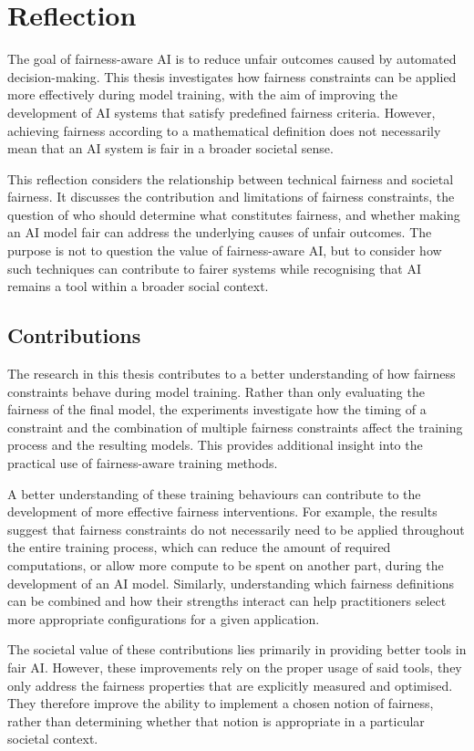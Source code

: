 \chapter{Reflection}
The goal of fairness-aware AI is to reduce unfair outcomes caused by automated decision-making. This thesis investigates how fairness constraints can be applied more effectively during model training, with the aim of improving the development of AI systems that satisfy predefined fairness criteria. However, achieving fairness according to a mathematical definition does not necessarily mean that an AI system is fair in a broader societal sense.

This reflection considers the relationship between technical fairness and societal fairness. It discusses the contribution and limitations of fairness constraints, the question of who should determine what constitutes fairness, and whether making an AI model fair can address the underlying causes of unfair outcomes. The purpose is not to question the value of fairness-aware AI, but to consider how such techniques can contribute to fairer systems while recognising that AI remains a tool within a broader social context.

\section{Contributions}
The research in this thesis contributes to a better understanding of how fairness constraints behave during model training. Rather than only evaluating the fairness of the final model, the experiments investigate how the timing of a constraint
and the combination of multiple fairness constraints affect the training process and the resulting models. This provides additional insight into the practical use of fairness-aware training methods. 

A better understanding of these training behaviours can contribute to the development of more effective fairness interventions. For example, the results suggest that fairness constraints do not necessarily need to be applied throughout the entire training process, which can reduce the amount of required computations, or allow more compute to be spent on another part, during the development of an AI model. Similarly, understanding which fairness definitions can be combined and how their strengths interact can help practitioners select more appropriate configurations for a given application.

The societal value of these contributions lies primarily in providing better tools in fair AI. However, these improvements rely on the proper usage of said tools, they only address the fairness properties that are explicitly measured and optimised. They therefore improve the ability to implement a chosen notion of fairness, rather than determining whether that notion is appropriate in a particular societal context.


